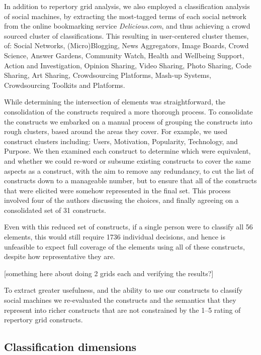 \documentclass{sig-alternate}
\begin{document}
In addition to repertory grid analysis, we also employed a classification analysis of social
machines, by extracting the most-tagged terms of each social network from the online
bookmarking service {\it Delicious.com}, and thus achieving a crowd sourced cluster of
classifications. This resulting in user-centered cluster 
themes, of: Social Networks, (Micro)Blogging, News Aggregators, Image Boards, Crowd Science,
Answer Gardens, Community Watch, Health and Wellbeing Support, Action and Investigation,
Opinion Sharing, Video Sharing, Photo Sharing, Code Sharing, Art Sharing, Crowdsourcing
Platforms, Mash-up Systems, Crowdsourcing Toolkits and Platforms.

While determining the intersection of elements was straightforward, the consolidation of the
constructs required a more thorough process. To consolidate the constructs we embarked on a manual process of grouping the constructs
into rough clusters, based around the areas they cover. For example, we used construct
clusters including: Users, Motivation, Popularity, Technology, and Purpose. We then examined
each construct to determine which were equivalent, and whether we could re-word or subsume
existing constructs to cover the same aspects as a construct, with the aim to remove any
redundancy, to cut the list of constructs down to a manageable number, but to ensure that
all of the constructs that were elicited were somehow represented in the final set. This
process involved four of the authors discussing the choices, and finally agreeing on a
consolidated set of 31 constructs.

Even with this reduced set of constructs, if a single person were to classify all 56
elements, this would still require 1736 individual decisions, and hence is unfeasible to
expect full coverage of the elements using all of these constructs, despite how representative
they are.


[something here about doing 2 grids each and verifying the results?]

To extract greater usefulness, and the ability to use our constructs to classify social
machines we re-evaluated the constructs and the semantics that they represent into richer
constructs that are not constrained by the 1--5 rating of repertory grid constructs.

\subsection{Classification dimensions}
\end{document}
